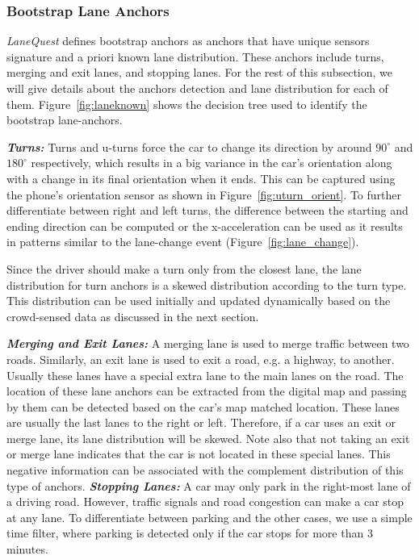 \documentclass[10pt, conference, compsocconf]{IEEEtran}
\def \sys {\textit{LaneQuest}}
\begin{document}
\subsubsection{Bootstrap Lane Anchors}
\sys{} defines bootstrap anchors as anchors that have unique sensors signature and a priori known lane distribution. These anchors include turns, merging and exit lanes, and stopping lanes. For the rest of this subsection, we will give details about the anchors detection and lane distribution for each of them. Figure~\ref{fig:laneknown} shows the decision tree used to identify the bootstrap lane-anchors.

\noindent\textbf{\textit{Turns:}}
Turns and u-turns force the car to change its direction by around $90^\circ$ and $180^\circ$ respectively, which results in a big variance in the car's orientation along with a change in its final orientation when it ends. This can be captured using the phone's orientation sensor as shown in Figure~\ref{fig:uturn_orient}. To further differentiate between right and left turns, the difference between the starting and ending direction can be computed or the x-acceleration can be used as it results in patterns similar to the lane-change event (Figure~\ref{fig:lane_change}).

Since the driver should make a turn only from the closest lane, the lane distribution for turn anchors is a skewed distribution according to the turn type. This distribution can be used initially and updated dynamically based on the crowd-sensed data as discussed in the next section.

\noindent\textbf{\textit{Merging and Exit Lanes:}}
A merging lane is used to merge traffic between two roads. Similarly, an exit lane is used to exit a road, e.g. a highway, to another. Usually these lanes have a special extra lane to the main lanes on the road. The location of these lane anchors can be extracted from the digital map and passing by them can be detected based on the car's map matched location.  These lanes are usually the last lanes to the right or left. Therefore, if a car uses an exit or merge lane, its lane distribution will be skewed. Note also that not taking an exit or merge lane indicates that the car is not located in these special lanes. This negative information can be associated with the complement distribution of this type of anchors.
\noindent\textbf{\textit{Stopping Lanes:}}
A car may only park in the right-most lane of a driving road. However, traffic signals and road congestion can make a car stop at any lane. To differentiate between parking and the other cases, we use a simple time filter, where parking is detected only if the car stops for more than 3 minutes.
\end{document}
